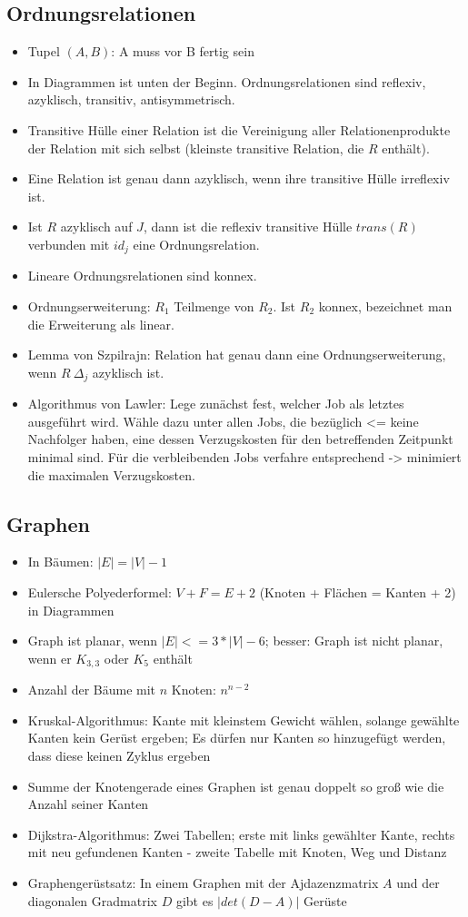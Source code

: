 \documentclass[12pt,landscape]{article}
\begin{document}
\begin{multicols}{3}
\subsection{Ordnungsrelationen}
\begin{itemize}
\item Tupel $(A, B)$: A muss vor B fertig sein
\item In Diagrammen ist unten der Beginn. Ordnungsrelationen sind reflexiv, azyklisch, transitiv, antisymmetrisch.
\item Transitive Hülle einer Relation ist die Vereinigung aller Relationenprodukte der Relation mit sich selbst (kleinste transitive Relation, die $R$ enthält).
\item Eine Relation ist genau dann azyklisch, wenn ihre transitive Hülle irreflexiv ist.
\item Ist $R$ azyklisch auf $J$, dann ist die reflexiv transitive Hülle $trans(R)$ verbunden mit $id_j$ eine Ordnungsrelation.
\item Lineare Ordnungsrelationen sind konnex.
\item Ordnungserweiterung: $R_1$ Teilmenge von $R_2$. Ist $R_2$ konnex, bezeichnet man die Erweiterung als linear.
\item Lemma von Szpilrajn: Relation hat genau dann eine Ordnungserweiterung, wenn $R \ \Delta_j$ azyklisch ist.
\item Algorithmus von Lawler: Lege zunächst fest, welcher Job als letztes ausgeführt wird. Wähle dazu unter allen Jobs, die bezüglich <= keine Nachfolger haben, eine dessen Verzugskosten für den betreffenden Zeitpunkt minimal sind. Für die verbleibenden Jobs verfahre entsprechend -> minimiert die maximalen Verzugskosten.
\end{itemize}
\subsection{Graphen}
\begin{itemize}
\item In Bäumen: $|E| = |V| - 1$
\item Eulersche Polyederformel: $V + F = E + 2$ (Knoten + Flächen = Kanten + 2) in Diagrammen
\item Graph ist planar, wenn $|E| <= 3 * |V| - 6$; besser: Graph ist nicht planar, wenn er $K_{3,3}$ oder $K_5$ enthält
\item Anzahl der Bäume mit $n$ Knoten: $n^{n-2}$
\item Kruskal-Algorithmus: Kante mit kleinstem Gewicht wählen, solange gewählte Kanten kein Gerüst ergeben; Es dürfen nur Kanten so hinzugefügt werden, dass diese keinen Zyklus ergeben
\item Summe der Knotengerade eines Graphen ist genau doppelt so groß wie die Anzahl seiner Kanten
\item Dijkstra-Algorithmus: Zwei Tabellen; erste mit links gewählter Kante, rechts mit neu gefundenen Kanten - zweite Tabelle mit Knoten, Weg und Distanz
\item Graphengerüstsatz: In einem Graphen mit der Ajdazenzmatrix $A$ und der diagonalen Gradmatrix $D$ gibt es $|det(D-A)|$ Gerüste
\end{itemize}

\end{multicols}
\end{document}

